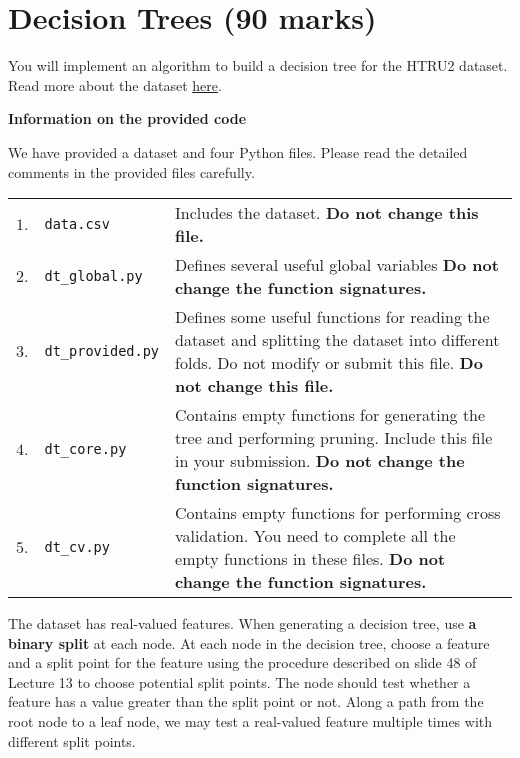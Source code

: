 \documentclass[12pt]{article}
\begin{document}
\newpage
\section{Decision Trees (90 marks)}
\label{question_dt}

You will implement an algorithm to build a decision tree for the HTRU2 dataset. Read more about the dataset \href{https://archive.ics.uci.edu/ml/datasets/HTRU2}{here}.

{\bf Information on the provided code}

We have provided a dataset and four Python files. Please read the detailed comments in the provided files carefully.

\begin{table}[ht!]
    \centering
    \begin{tabular}{llp{11.9cm}}
         $1.$ & \verb+data.csv+ & Includes the dataset. {\bf Do not change this file.} \\[5pt]
         $2.$ & \verb+dt_global.py+ &  Defines several useful global variables {\bf Do not change the function signatures.} \\[5pt]
         $3.$ & \verb+dt_provided.py+ & Defines some useful functions for reading the dataset and splitting the dataset into different folds. Do not modify or submit this file. {\bf Do not change this file.} \\[5pt]
         $4.$ & \verb+dt_core.py+ & Contains empty functions for generating the tree and performing pruning. Include this file in your submission. {\bf Do not change the function signatures.} \\[5pt]
         $5.$ & \verb+dt_cv.py+ & Contains empty functions for performing cross validation. You need to complete all the empty functions in these files. {\bf Do not change the function signatures.} \\[5pt]
    \end{tabular}
    \label{tab:files_desc}
\end{table}

The dataset has real-valued features. When generating a decision tree, use {\bf a binary split} at each node. At each node in the decision tree, choose a feature and a split point for the feature using the procedure described on slide 48 of Lecture 13 to choose potential split points. The node should test whether a feature has a value greater than the split point or not. Along a path from the root node to a leaf node, we may test a real-valued feature multiple times with different split points.
\end{document}
